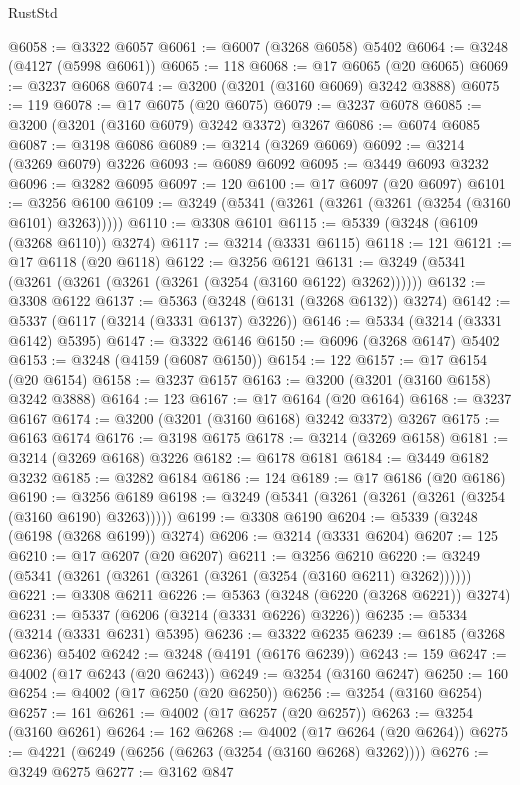 \begin{lexlean}{RustStd}
\begin{coremodule}
{\begin{coremodule}
{{{{{{{{{{{{{{{{{{{{{{{{{@6058 := @3322 @6057
@6061 := @6007 (@3268 @6058) @5402
@6064 := @3248 (@4127 (@5998 @6061))
@6065 := 118
@6068 := @17 @6065 (@20 @6065)
@6069 := @3237 @6068
@6074 := @3200 (@3201 (@3160 @6069) @3242 @3888)
@6075 := 119
@6078 := @17 @6075 (@20 @6075)
@6079 := @3237 @6078
@6085 := @3200 (@3201 (@3160 @6079) @3242 @3372) @3267
@6086 := @6074 @6085
@6087 := @3198 @6086
@6089 := @3214 (@3269 @6069)
@6092 := @3214 (@3269 @6079) @3226
@6093 := @6089 @6092
@6095 := @3449 @6093 @3232
@6096 := @3282 @6095
@6097 := 120
@6100 := @17 @6097 (@20 @6097)
@6101 := @3256 @6100
@6109 := @3249 (@5341 (@3261 (@3261 (@3261 (@3254 (@3160 @6101) @3263)))))
@6110 := @3308 @6101
@6115 := @5339 (@3248 (@6109 (@3268 @6110)) @3274)
@6117 := @3214 (@3331 @6115)
@6118 := 121
@6121 := @17 @6118 (@20 @6118)
@6122 := @3256 @6121
@6131 := @3249 (@5341 (@3261 (@3261 (@3261 (@3261 (@3254 (@3160 @6122) @3262))))))
@6132 := @3308 @6122
@6137 := @5363 (@3248 (@6131 (@3268 @6132)) @3274)
@6142 := @5337 (@6117 (@3214 (@3331 @6137) @3226))
@6146 := @5334 (@3214 (@3331 @6142) @5395)
@6147 := @3322 @6146
@6150 := @6096 (@3268 @6147) @5402
@6153 := @3248 (@4159 (@6087 @6150))
@6154 := 122
@6157 := @17 @6154 (@20 @6154)
@6158 := @3237 @6157
@6163 := @3200 (@3201 (@3160 @6158) @3242 @3888)
@6164 := 123
@6167 := @17 @6164 (@20 @6164)
@6168 := @3237 @6167
@6174 := @3200 (@3201 (@3160 @6168) @3242 @3372) @3267
@6175 := @6163 @6174
@6176 := @3198 @6175
@6178 := @3214 (@3269 @6158)
@6181 := @3214 (@3269 @6168) @3226
@6182 := @6178 @6181
@6184 := @3449 @6182 @3232
@6185 := @3282 @6184
@6186 := 124
@6189 := @17 @6186 (@20 @6186)
@6190 := @3256 @6189
@6198 := @3249 (@5341 (@3261 (@3261 (@3261 (@3254 (@3160 @6190) @3263)))))
@6199 := @3308 @6190
@6204 := @5339 (@3248 (@6198 (@3268 @6199)) @3274)
@6206 := @3214 (@3331 @6204)
@6207 := 125
@6210 := @17 @6207 (@20 @6207)
@6211 := @3256 @6210
@6220 := @3249 (@5341 (@3261 (@3261 (@3261 (@3261 (@3254 (@3160 @6211) @3262))))))
@6221 := @3308 @6211
@6226 := @5363 (@3248 (@6220 (@3268 @6221)) @3274)
@6231 := @5337 (@6206 (@3214 (@3331 @6226) @3226))
@6235 := @5334 (@3214 (@3331 @6231) @5395)
@6236 := @3322 @6235
@6239 := @6185 (@3268 @6236) @5402
@6242 := @3248 (@4191 (@6176 @6239))
@6243 := 159
@6247 := @4002 (@17 @6243 (@20 @6243))
@6249 := @3254 (@3160 @6247)
@6250 := 160
@6254 := @4002 (@17 @6250 (@20 @6250))
@6256 := @3254 (@3160 @6254)
@6257 := 161
@6261 := @4002 (@17 @6257 (@20 @6257))
@6263 := @3254 (@3160 @6261)
@6264 := 162
@6268 := @4002 (@17 @6264 (@20 @6264))
@6275 := @4221 (@6249 (@6256 (@6263 (@3254 (@3160 @6268) @3262))))
@6276 := @3249 @6275
@6277 := @3162 @847
}}}}}}}}}}}}}}}}}}}}}}}}}
\end{coremodule}}
\end{coremodule}
\end{lexlean}
